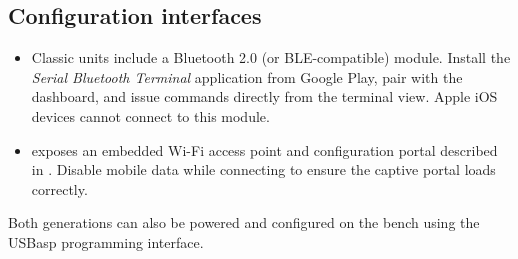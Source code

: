 \subsection{Configuration interfaces}
\begin{itemize}
    \item Classic \ReplicaGenOne{} units include a Bluetooth 2.0 (or BLE-compatible) module. Install the \emph{Serial Bluetooth Terminal} application from Google Play, pair with the dashboard, and issue commands directly from the terminal view. Apple iOS devices cannot connect to this module.
    \item \ReplicaNextShort{} exposes an embedded Wi-Fi access point and configuration portal described in . Disable mobile data while connecting to ensure the captive portal loads correctly.
\end{itemize}
Both generations can also be powered and configured on the bench using the USBasp programming interface.
